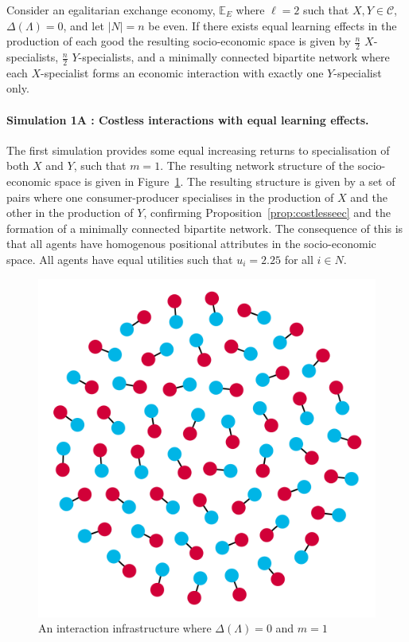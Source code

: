 \begin{proposition} \label{prop:costlesseec}
Consider an egalitarian exchange economy, $\mathbb{E}_{E}$ where $\ell = 2$ such that $X,Y \in \mathcal{C}$,  $\Delta(\Lambda) = 0$, and let $|N|=n$ be even. If there exists equal learning effects in the production of each good the resulting socio-economic space is given by $\frac{n}{2}$ $X$-specialists, $\frac{n}{2}$ $Y$-specialists, and a minimally connected bipartite network where each $X$-specialist forms an economic interaction with exactly one $Y$-specialist only.
\end{proposition}

\paragraph{Simulation 1A : Costless interactions with equal learning effects.}

The first simulation provides some equal increasing returns to specialisation of both $X$ and $Y$, such that $m = 1$. The resulting network structure of the socio-economic space is given in Figure~\ref{Sim1}. The resulting structure is given by a set of pairs where one consumer-producer specialises in the production of $X$ and the other in the production of $Y$, confirming Proposition~\ref{prop:costlesseec} and the formation of a minimally connected bipartite network. The consequence of this is that all agents have homogenous positional attributes in the socio-economic space. All agents have equal utilities such that $u_{i} = 2.25$ for all $i \in N$.

\begin{figure}[t]
\centering
\includegraphics[scale=0.22]{imgs/Sim1E.png}
\caption{An interaction infrastructure where $\Delta(\Lambda)=0$ and $m=1$}
\label{Sim1}
\end{figure}

